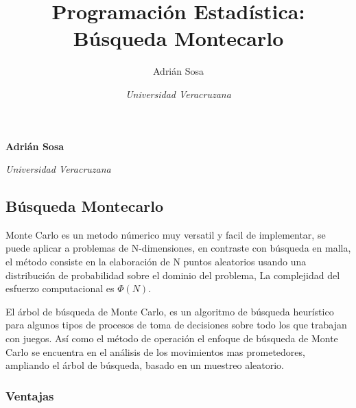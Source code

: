 \documentclass[11pt,]{article}
\title{Programación Estadística: Búsqueda Montecarlo  }
\author{\Large Adrián Sosa\vspace{0.05in} \newline\normalsize\emph{}   \and \Large \vspace{0.05in} \newline\normalsize\emph{Universidad Veracruzana}  }
\date{}
\newcommand*{\authorfont}{\fontfamily{phv}\selectfont}
\begin{document}
	
%

{%
\setlength{\parindent}{0pt}
\thispagestyle{plain}
{\fontsize{18}{20}\selectfont\raggedright 
\maketitle  %

}

{
   \vskip 13.5pt\relax \normalsize\fontsize{11}{12} 
\textbf{\authorfont Adrián Sosa} \hskip 15pt \emph{\small }   \par \textbf{\authorfont } \hskip 15pt \emph{\small Universidad Veracruzana}   
}

}






\vskip -8.5pt



\noindent  

\hypertarget{buxfasqueda-montecarlo}{%
\subsection{Búsqueda Montecarlo}\label{buxfasqueda-montecarlo}}

Monte Carlo es un metodo númerico muy versatil y facil de implementar,
se puede aplicar a problemas de N-dimensiones, en contraste con búsqueda
en malla, el método consiste en la elaboración de N puntos aleatorios
usando una distribución de probabilidad sobre el dominio del problema,
La complejidad del esfuerzo computacional es \(\Phi(N)\).

El árbol de búsqueda de Monte Carlo, es un algoritmo de búsqueda
heurístico para algunos tipos de procesos de toma de decisiones sobre
todo los que trabajan con juegos. Así como el método de operación el
enfoque de búsqueda de Monte Carlo se encuentra en el análisis de los
movimientos mas prometedores, ampliando el árbol de búsqueda, basado en
un muestreo aleatorio.

\hypertarget{ventajas}{%
\subsubsection{Ventajas}\label{ventajas}}
\end{document}
